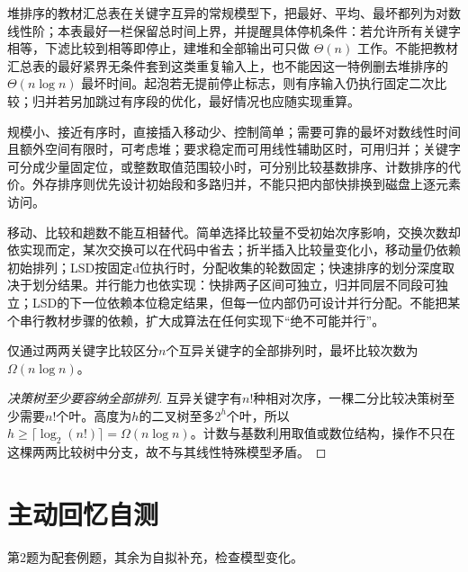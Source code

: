 堆排序的教材汇总表在关键字互异的常规模型下，把最好、平均、最坏都列为对数线性阶；本表最好一栏保留总时间上界，并提醒具体停机条件：若允许所有关键字相等，下滤比较到相等即停止，建堆和全部输出可只做 \(\Theta(n)\) 工作。不能把教材汇总表的最好紧界无条件套到这类重复输入上，也不能因这一特例删去堆排序的 \(\Theta(n\log n)\) 最坏时间。起泡若无提前停止标志，则有序输入仍执行固定二次比较；归并若另加跳过有序段的优化，最好情况也应随实现重算。

规模小、接近有序时，直接插入移动少、控制简单；需要可靠的最坏对数线性时间且额外空间有限时，可考虑堆；要求稳定而可用线性辅助区时，可用归并；关键字可分成少量固定位，或整数取值范围较小时，可分别比较基数排序、计数排序的代价。外存排序则优先设计初始段和多路归并，不能只把内部快排换到磁盘上逐元素访问。

移动、比较和趟数不能互相替代。简单选择比较量不受初始次序影响，交换次数却依实现而定，某次交换可以在代码中省去；折半插入比较量变化小，移动量仍依赖初始排列；LSD按固定d位执行时，分配收集的轮数固定；快速排序的划分深度取决于划分结果。并行能力也依实现：快排两子区间可独立，归并同层不同段可独立；LSD的下一位依赖本位稳定结果，但每一位内部仍可设计并行分配。不能把某个串行教材步骤的依赖，扩大成算法在任何实现下``绝不可能并行''。

\begin{theorem}[比较排序下界的适用模型]

仅通过两两关键字比较区分\(n\)个互异关键字的全部排列时，最坏比较次数为\(\Omega(n\log n)\)。

\end{theorem}

\begin{proof}[决策树至少要容纳全部排列]

互异关键字有\(n!\)种相对次序，一棵二分比较决策树至少需要\(n!\)个叶。高度为\(h\)的二叉树至多\(2^h\)个叶，所以\(h\ge\lceil\log_2(n!)\rceil=\Omega(n\log n)\)。计数与基数利用取值或数位结构，操作不只在这棵两两比较树中分支，故不与其线性特殊模型矛盾。

\end{proof}

\section{主动回忆自测}\label{DS08-check}

第2题为配套例题，其余为自拟补充，检查模型变化。

